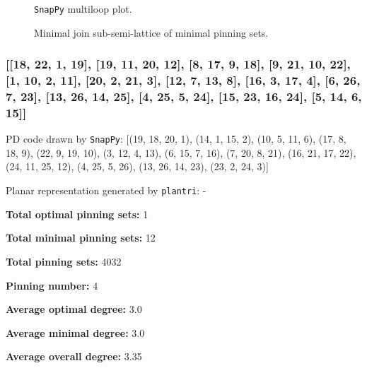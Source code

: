 \documentclass{article}%
\begin{document}
\begin{multicols}{2}
\begin{figure}[H]
\centering

\caption{\texttt{SnapPy} multiloop plot.}
\label{fig:tex/img/[[22, 11, 1, 12], [12, 8, 13, 7], [21, 6, 22, 7], [10, 5, 11, 6], [1, 18, 2, 19], [8, 19, 9, 20], [13, 20, 14, 21], [14, 9, 15, 10], [4, 26, 5, 23], [17, 25, 18, 26], [2, 25, 3, 24], [15, 24, 16, 23],.svg}
\end{figure}
\columnbreak

\begin{figure}[H]
\centering
\scalebox{0.8}{}
\caption{Minimal join sub-semi-lattice of minimal pinning sets.}
\label{fig:tex/img/[[22, 11, 1, 12], [12, 8, 13, 7], [21, 6, 22, 7], [10, 5, 11, 6], [1, 18, 2, 19], [8, 19, 9, 20], [13, 20, 14, 21], [14, 9, 15, 10], [4, 26, 5, 23], [17, 25, 18, 26], [2, 25, 3, 24], [15, 24, 16, 23],.pgf}
\end{figure}
\end{multicols}

\newpage

\subsubsection{[[18, 22, 1, 19], [19, 11, 20, 12], [8, 17, 9, 18], [9, 21, 10, 22], [1, 10, 2, 11], [20, 2, 21, 3], [12, 7, 13, 8], [16, 3, 17, 4], [6, 26, 7, 23], [13, 26, 14, 25], [4, 25, 5, 24], [15, 23, 16, 24], [5, 14, 6, 15]]}

{\small\noindent PD code drawn by \texttt{SnapPy}: [(19, 18, 20, 1), (14, 1, 15, 2), (10, 5, 11, 6), (17, 8, 18, 9), (22, 9, 19, 10), (3, 12, 4, 13), (6, 15, 7, 16), (7, 20, 8, 21), (16, 21, 17, 22), (24, 11, 25, 12), (4, 25, 5, 26), (13, 26, 14, 23), (23, 2, 24, 3)]}

{\small\noindent Planar representation generated by \texttt{plantri}: -}

\begin{multicols}{2}
{\normalsize \noindent\textbf{Total optimal pinning sets:} 1

\noindent\textbf{Total minimal pinning sets:} 12

\noindent\textbf{Total pinning sets:} 4032

\noindent\textbf{Pinning number:} 4

}
\columnbreak

{\normalsize \noindent\textbf{Average optimal degree:} 3.0

\noindent\textbf{Average minimal degree:} 3.0

\noindent\textbf{Average overall degree:} 3.35

}
\end{multicols}
\end{document}
